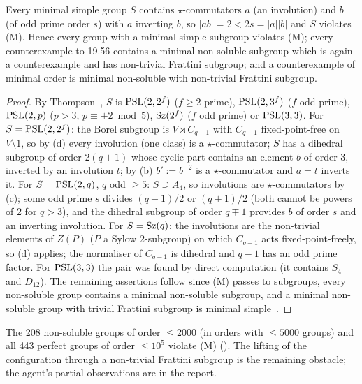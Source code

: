 \begin{theorem}\label{thm:1956app}
Every minimal simple group $S$ contains $\star$-commutators $a$ (an involution) and $b$ (of odd prime order $s$) with
$a$ inverting $b$, so $|ab|=2<2s=|a||b|$ and $S$ violates (M). Hence every group with a minimal simple subgroup
violates (M); every counterexample to 19.56 contains a minimal non-soluble subgroup which is again a
counterexample and has non-trivial Frattini subgroup; and a counterexample of minimal order is minimal
non-soluble with non-trivial Frattini subgroup.
\end{theorem}
\begin{proof}
By Thompson~\cite{Thompson}, $S$ is $\mathrm{PSL}(2,2^f)$ ($f\ge 2$ prime), $\mathrm{PSL}(2,3^f)$ ($f$ odd prime), $\mathrm{PSL}(2,p)$ ($p>3$,
$p\equiv\pm2\bmod 5$), $\mathrm{Sz}(2^f)$ ($f$ odd prime) or $\mathrm{PSL}(3,3)$.
For $S=\mathrm{PSL}(2,2^f)$: the Borel subgroup is $V\rtimes C_{q-1}$ with $C_{q-1}$ fixed-point-free on $V\setminus 1$, so by
(d) every involution (one class) is a $\star$-commutator; $S$ has a dihedral subgroup of order $2(q\pm1)$ whose
cyclic part contains an element $b$ of order 3, inverted by an involution $t$; by (b) $b':=b^{-2}$ is a
$\star$-commutator and $a=t$ inverts it. For $S=\mathrm{PSL}(2,q)$, $q$ odd $\ge 5$: $S\supseteq A_4$, so involutions are
$\star$-commutators by (c); some odd prime $s$ divides $(q-1)/2$ or $(q+1)/2$ (both cannot be powers of 2 for $q>3$),
and the dihedral subgroup of order $q\mp1$ provides $b$ of order $s$ and an inverting involution. For
$S=\mathrm{Sz}(q)$: the involutions are the non-trivial elements of $Z(P)$ ($P$ a Sylow 2-subgroup) on which $C_{q-1}$
acts fixed-point-freely, so (d) applies; the normaliser of $C_{q-1}$ is dihedral and $q-1$ has an odd prime factor.
For $\mathrm{PSL}(3,3)$ the pair was found by direct computation (it contains $S_4$ and $D_{12}$). The
remaining assertions follow since (M) passes to subgroups, every non-soluble group contains a minimal non-soluble
subgroup, and a minimal non-soluble group with trivial Frattini subgroup is minimal simple~\cite{Thompson}.
\end{proof}
The 208 non-soluble groups of order $\le 2000$ (in orders with $\le 5000$ groups) and all 443 perfect groups of
order $\le 10^5$ violate (M)
(). The lifting of the configuration through a non-trivial Frattini subgroup is the remaining
obstacle; the agent's partial observations are in the report.

